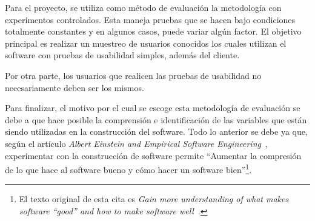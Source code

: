 Para el proyecto, se utiliza como método de evaluación la metodología con experimentos controlados. Esta maneja pruebas que se hacen bajo condiciones totalmente constantes y en algunos casos, puede variar algún factor. El objetivo principal es realizar un muestreo de usuarios conocidos los cuales utilizan el software con pruebas de usabilidad simples, además del cliente.

Por otra parte, los usuarios que realicen las pruebas de usabilidad no necesariamente deben ser los mismos.

Para finalizar, el motivo por el cual se escoge esta metodología de evaluación se debe a que hace posible la comprensión e identificación de las variables que están siendo utilizadas en la construcción del software.  Todo lo anterior se debe ya que, según el artículo \emph{Albert Einstein and Empirical Software Engineering}~\cite{8}, experimentar con la construcción de software permite ``Aumentar la compresión de lo que hace al software bueno y cómo hacer un software bien''\footnote{El texto original de esta cita es \emph{Gain more understanding of what makes software ``good'' and how to make software well}~\cite{8}.}.
